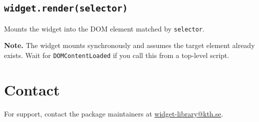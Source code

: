 \documentclass[english,11pt]{kth-document}
\begin{document}
\subsection{\texttt{widget.render(selector)}}

Mounts the widget into the DOM element matched by \texttt{selector}.

\begin{kthnotebox}
\textbf{Note.} The widget mounts synchronously and assumes the target
element already exists. Wait for \texttt{DOMContentLoaded} if you call
this from a top-level script.
\end{kthnotebox}

\section{Contact}

For support, contact the package maintainers at
\href{mailto:widget-library@kth.se}{widget-library@kth.se}.
\end{document}
